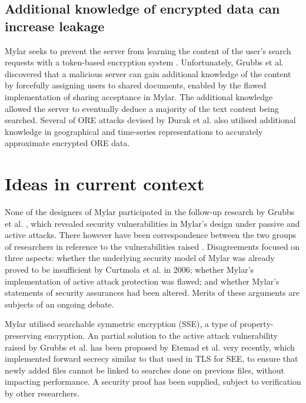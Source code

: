\documentclass[11pt]{article}
\begin{document}
\subsection{Additional knowledge of encrypted data can increase leakage}
 
Mylar seeks to prevent the server from learning the content of the user's search requests with a token-based encryption system \cite[5.1]{popa2014building}. Unfortunately, Grubbs et al. \cite{grubbs2016breaking} discovered that a malicious server can gain additional knowledge of the content by forcefully assigning users to shared documents, enabled by the flawed implementation of sharing acceptance in Mylar. The additional knowledge allowed the server to eventually deduce a majority of the text content being searched. Several of ORE attacks devised by Durak et al. \cite[Sec. 4]{durak2016else} also utilised additional knowledge in geographical and time-series representations to accurately approximate encrypted ORE data. 
 
\section{Ideas in current context}

None of the designers of Mylar participated in the follow-up research by Grubbs et al. \cite{grubbs2016breaking}, which revealed security vulnerabilities in Mylar's design under passive and active attacks. There however have been correspondence between the two groups of researchers in reference to the vulnerabilities raised \cite{mylar-response} \cite{mylar-response-response}. Disagreements focused on three aspects: whether the underlying security model of Mylar was already proved to be insufficient by Curtmola et al. \cite{curtmola2006searchable} in 2006; whether Mylar's implementation of active attack protection was flawed; and whether Mylar's statements of security assurances had been altered. Merits of these arguments are subjects of an ongoing debate.

Mylar utilised searchable symmetric encryption (SSE), a type of property-preserving encryption. An partial solution to the active attack vulnerability raised by Grubbs et al. \cite{grubbs2016breaking} has been proposed by Etemad et al. \cite{etemad2018efficient} very recently, which implemented forward secrecy similar to that used in TLS for SEE, to ensure that newly added files cannot be linked to searches done on previous files, without impacting performance. A security proof has been supplied, subject to verification by other researchers.
\end{document}
